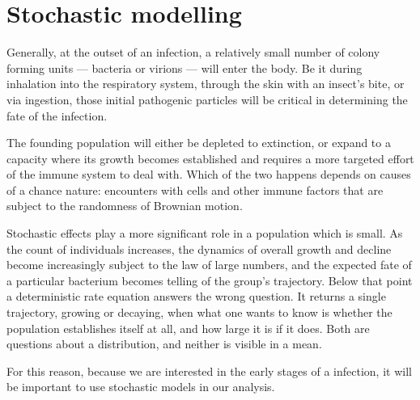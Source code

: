 \section{Stochastic modelling}

Generally, at the outset of an infection, a relatively small number of colony
forming units --- bacteria or virions --- will enter the body. Be it during
inhalation into the respiratory system, through the skin with an insect's bite,
or via ingestion, those initial pathogenic particles will be critical in
determining the fate of the infection.

The founding population will either be depleted to extinction, or expand to a
capacity where its growth becomes established and requires a more targeted
effort of the immune system to deal with. Which of the two happens depends on
causes of a chance nature: encounters with cells and other immune factors that
are subject to the randomness of Brownian motion.

Stochastic effects play a more significant role in a population which is small.
As the count of individuals increases, the dynamics of overall growth and
decline become increasingly subject to the law of large numbers, and the
expected fate of a particular bacterium becomes telling of the group's
trajectory. Below that point a deterministic rate equation answers the wrong
question. It returns a single trajectory, growing or decaying, when what one
wants to know is whether the population establishes itself at all, and how
large it is if it does. Both are questions about a distribution, and neither is
visible in a mean.

For this reason, because we are interested in the early stages of a \yp{}
infection, it will be important to use stochastic models in our analysis.

